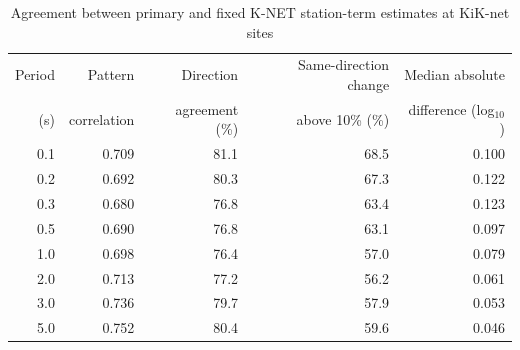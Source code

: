 \documentclass[10pt]{article}
\begin{document}
\begin{table}[H]
\centering
\caption{Cross-network and independent-earthquake station-term estimation}
\scriptsize
{}
\end{table}

\begin{table}[H]
\centering
\caption{Agreement between primary and fixed K-NET station-term estimates at KiK-net sites}
\small
\begin{tabular}{rrrrr}
\toprule
Period & Pattern & Direction & Same-direction change & Median absolute \\
(s) & correlation & agreement (\%) & above 10\% (\%) & difference (log$_{10}$) \\
\midrule
0.1 & 0.709 & 81.1 & 68.5 & 0.100 \\
0.2 & 0.692 & 80.3 & 67.3 & 0.122 \\
0.3 & 0.680 & 76.8 & 63.4 & 0.123 \\
0.5 & 0.690 & 76.8 & 63.1 & 0.097 \\
1.0 & 0.698 & 76.4 & 57.0 & 0.079 \\
2.0 & 0.713 & 77.2 & 56.2 & 0.061 \\
3.0 & 0.736 & 79.7 & 57.9 & 0.053 \\
5.0 & 0.752 & 80.4 & 59.6 & 0.046 \\
\bottomrule
\end{tabular}
\end{table}
\end{document}
